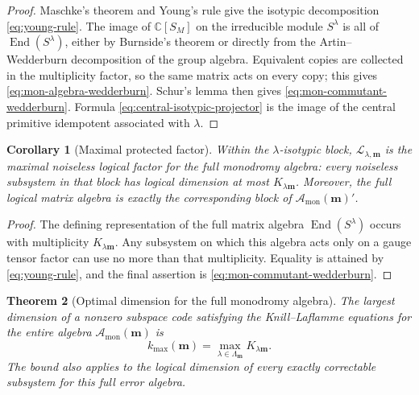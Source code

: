 \documentclass[11pt]{article}
\newtheorem{theorem}{Theorem}[section]
\newtheorem{corollary}[theorem]{Corollary}
\theoremstyle{definition}
\theoremstyle{remark}
\newcommand{\C}{\mathbb C}
\newcommand{\cA}{\mathcal A}
\newcommand{\cL}{\mathcal L}
\newcommand{\End}{\operatorname{End}}
\begin{document}
\begin{proof}
Maschke's theorem and Young's rule give the isotypic decomposition \eqref{eq:young-rule}.  The image of $\C[S_M]$ on the irreducible module $S^\lambda$ is all of $\End(S^\lambda)$, either by Burnside's theorem or directly from the Artin--Wedderburn decomposition of the group algebra.  Equivalent copies are collected in the multiplicity factor, so the same matrix acts on every copy; this gives \eqref{eq:mon-algebra-wedderburn}.  Schur's lemma then gives \eqref{eq:mon-commutant-wedderburn}.  Formula \eqref{eq:central-isotypic-projector} is the image of the central primitive idempotent associated with $\lambda$.
\end{proof}

\begin{corollary}[Maximal protected factor]\label{cor:maximal-protected-factor}
Within the $\lambda$-isotypic block, $\cL_{\lambda,\boldsymbol m}$ is the maximal noiseless logical factor for the full monodromy algebra: every noiseless subsystem in that block has logical dimension at most $K_{\lambda\boldsymbol m}$.  Moreover, the full logical matrix algebra is exactly the corresponding block of $\cA_{\mathrm{mon}}(\boldsymbol m)'$.
\end{corollary}

\begin{proof}
The defining representation of the full matrix algebra $\End(S^\lambda)$ occurs with multiplicity $K_{\lambda\boldsymbol m}$.  Any subsystem on which this algebra acts only on a gauge tensor factor can use no more than that multiplicity.  Equality is attained by \eqref{eq:young-rule}, and the final assertion is \eqref{eq:mon-commutant-wedderburn}.
\end{proof}

\begin{theorem}[Optimal dimension for the full monodromy algebra]\label{thm:optimal-dimension}
The largest dimension of a nonzero subspace code satisfying the Knill--Laflamme equations for the entire algebra $\cA_{\mathrm{mon}}(\boldsymbol m)$ is
\begin{equation}\label{eq:optimal-dimension}
 k_{\max}(\boldsymbol m)=\max_{\lambda\in\Lambda_{\boldsymbol m}}K_{\lambda\boldsymbol m}.
\end{equation}
The bound also applies to the logical dimension of every exactly correctable subsystem for this full error algebra.
\end{theorem}
\end{document}
